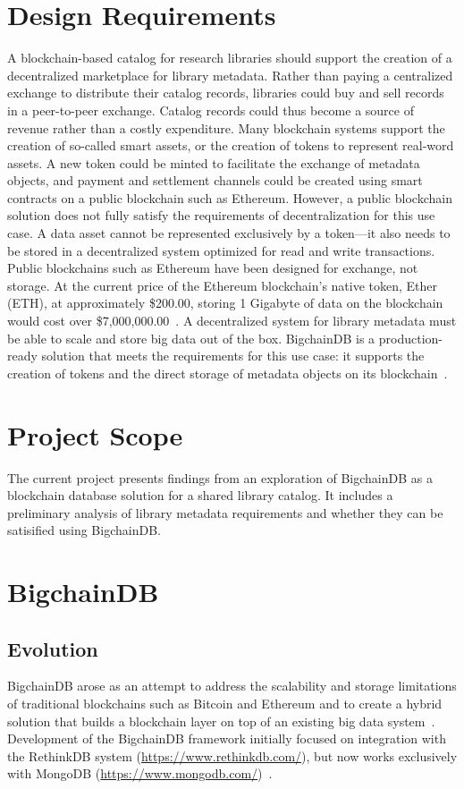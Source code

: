 \section{Design Requirements}
A blockchain-based catalog for research libraries should support the
creation of a decentralized marketplace for library metadata. Rather than
paying a centralized exchange to distribute their catalog records, libraries
could buy and sell records in a peer-to-peer exchange. Catalog records could
thus become a source of revenue rather than a costly expenditure. Many
blockchain systems support the creation of so-called smart assets, or the
creation of tokens to represent real-word assets. A new token could be
minted to facilitate the exchange of metadata objects, and payment and
settlement channels could be created using smart contracts on a public
blockchain such as Ethereum. However, a public blockchain solution does not
fully satisfy the requirements of decentralization for this use case. A data
asset cannot be represented exclusively by a token---it also needs to be
stored in a decentralized system optimized for read and write transactions.
Public blockchains such as Ethereum have been designed for exchange, not
storage. At the current price of the Ethereum blockchain's native token,
Ether (ETH), at approximately \$200.00, storing 1 Gigabyte of data on the
blockchain would cost over \$7,000,000.00~\cite{tHess16}. A decentralized
system for library metadata must be able to scale and store big data out of
the box. BigchainDB is a production-ready solution that meets the
requirements for this use case: it supports the creation of tokens and the
direct storage of metadata objects on its
blockchain~\cite{bdb18c}.

\section{Project Scope}
The current project presents findings from an exploration of BigchainDB as a 
blockchain database solution for a shared library catalog. It includes a 
preliminary analysis of library metadata requirements and whether they can be 
satisified using BigchainDB.

\section{BigchainDB}
\subsection{Evolution}
BigchainDB arose as an attempt to address the scalability and storage
limitations of traditional blockchains such as Bitcoin and Ethereum and to
create a hybrid solution that builds a blockchain layer on top of an
existing big data system~\cite{bigDB18}. Development of the BigchainDB
framework initially focused on integration with the RethinkDB system
(\url{https://www.rethinkdb.com/}), but now works exclusively with MongoDB
(\url{https://www.mongodb.com/})~\cite{ks16, bigDB18}.

